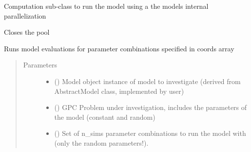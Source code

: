 \documentclass[letterpaper,10pt,english,openany,oneside]{sphinxmanual}
\begin{document}
\begin{fulllineitems}
\label{\detokenize{pygpc:pygpc.Computation.ComputationFuncPar}}
Computation sub-class to run the model using a the models internal parallelization

\begin{fulllineitems}
\label{\detokenize{pygpc:pygpc.Computation.ComputationFuncPar.close}}
Closes the pool

\end{fulllineitems}


\begin{fulllineitems}
\label{\detokenize{pygpc:pygpc.Computation.ComputationFuncPar.run}}
Runs model evaluations for parameter combinations specified in coords array
\begin{quote}\begin{description}
\item[{Parameters}] \leavevmode\begin{itemize}
\item {} 
 () \textendash{} Model object instance of model to investigate (derived from AbstractModel class, implemented by user)

\item {} 
 () \textendash{} GPC Problem under investigation, includes the parameters of the model (constant and random)

\item {} 
 (\sphinxstyleliteralemphasis{\sphinxupquote{ {[}}}\sphinxstyleliteralemphasis{\sphinxupquote{, }}\sphinxstyleliteralemphasis{\sphinxupquote{{]}}}) \textendash{} Set of n\_sims parameter combinations to run the model with (only the random parameters!).


\end{itemize}
\end{description}
\end{quote}
\end{fulllineitems}
\end{fulllineitems}
\end{document}

